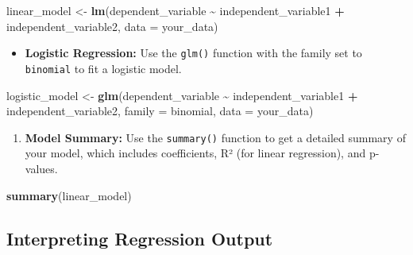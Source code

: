 \documentclass[
]{book}
\newenvironment{Shaded}{\begin{snugshade}}{\end{snugshade}}
\newcommand{\AttributeTok}[1]{\textcolor[rgb]{0.13,0.29,0.53}{#1}}
\newcommand{\FunctionTok}[1]{\textcolor[rgb]{0.13,0.29,0.53}{\textbf{#1}}}
\newcommand{\NormalTok}[1]{#1}
\newcommand{\OtherTok}[1]{\textcolor[rgb]{0.56,0.35,0.01}{#1}}
\newcommand{\SpecialCharTok}[1]{\textcolor[rgb]{0.81,0.36,0.00}{\textbf{#1}}}
\providecommand{\tightlist}{%
  \setlength{\itemsep}{0pt}\setlength{\parskip}{0pt}}
\begin{document}
\begin{Shaded}
\begin{Highlighting}[]
\NormalTok{   linear\_model }\OtherTok{\textless{}{-}} \FunctionTok{lm}\NormalTok{(dependent\_variable }\SpecialCharTok{\textasciitilde{}}\NormalTok{ independent\_variable1 }\SpecialCharTok{+}\NormalTok{ independent\_variable2, }\AttributeTok{data =}\NormalTok{ your\_data)}
\end{Highlighting}
\end{Shaded}

\begin{itemize}
\tightlist
\item
  \textbf{Logistic Regression:} Use the \texttt{glm()} function with the family set to \texttt{binomial} to fit a logistic model.
\end{itemize}

\begin{Shaded}
\begin{Highlighting}[]
\NormalTok{   logistic\_model }\OtherTok{\textless{}{-}} \FunctionTok{glm}\NormalTok{(dependent\_variable }\SpecialCharTok{\textasciitilde{}}\NormalTok{ independent\_variable1 }\SpecialCharTok{+}\NormalTok{ independent\_variable2, }\AttributeTok{family =}\NormalTok{ binomial, }\AttributeTok{data =}\NormalTok{ your\_data)}
\end{Highlighting}
\end{Shaded}

\begin{enumerate}
\def\labelenumi{\arabic{enumi}.}
\setcounter{enumi}{3}
\tightlist
\item
  \textbf{Model Summary:} Use the \texttt{summary()} function to get a detailed summary of your model, which includes coefficients, R² (for linear regression), and p-values.
\end{enumerate}

\begin{Shaded}
\begin{Highlighting}[]
   \FunctionTok{summary}\NormalTok{(linear\_model)}
\end{Highlighting}
\end{Shaded}

\subsection*{Interpreting Regression Output}\label{interpreting-regression-output}
\end{document}
